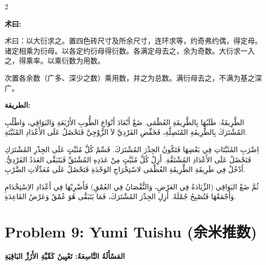 \documentclass[11pt,a4paper]{article}
\newcommand{\ar}[1]{\arabicfont\beginR #1\endR}
\newcommand{\zhtext}[1]{{\chinese #1}}
\newenvironment{bilingual}{%
  \begin{paracol}{2}
}{%
  \end{paracol}
}
\newcommand{\cnlabel}[1]{\textcolor{algocolor}{\textbf{#1}}}
\newcommand{\arlabel}[1]{\ar{\textcolor{algocolor}{\textbf{#1}}}}
\begin{document}
\begin{bilingual}

\begin{leftcolumn*}
\cnlabel{术曰:}

术曰：以大衍求之。置四色砖尺寸及所余尺寸，连环求等，约奇弗约偶，得定母。诸定相乘为衍母。以各定约衍母得衍数。各满定母去之，余为奇数。大衍求一入之，得乘率。以乘衍数为用数。

次置各余数（广多、深少之数）乘用数，并之为总数。满衍母去之，不满为基之深广。
\end{leftcolumn*}

\begin{rightcolumn*}
\arlabel{الطريقة:}

\ar{الطَّرِيقَةُ: طَلَبُهَا بِالطَّرِيقَةِ العُظْمَى. ضَعْ أَبْعَادَ أَنْوَاعِ الطُّوبِ الأَرْبَعَةِ وَالبَوَاقِي، وَاطْلُبِ المُشْتَرَكَ بِالطَّرِيقَةِ المُتَصِلَّةِ، فَخَفِّضِ الفَرْدِيَّ لاَ الزَّوْجِيَّ فَتَحْصُلُ عَلَى الأَعْدَادِ المُثَبَّتَةِ.}

\ar{اِضْرَبِ المُثَبَّتَاتِ فِي بَعْضِهَا فَتَكُونُ الجِذْرَ المُشْتَرَكَ. قَسِّمْ كُلَّ مُثَبَّتٍ عَلَى الجِذْرِ المُشْتَرَكِ فَتَحْصُلُ عَلَى الأَعْدَادِ المُشْتَقَّةِ. أَزِلْ كُلَّ مُثَبَّتٍ مِنْ عَدَدِهِ المُشْتَقِّ فَيَتَبَقَّى العَدَدُ الفَرْدِيُّ. اُدْخُلْ فِي طَرِيقَةِ الطَّرِيقَةِ العُظْمَى لاسْتِخْرَاجِ الوَحْدَةِ فَتَحْصُلُ عَلَى مُعَدِّلَاتِ الضَّرْبِ.}

\ar{ثُمَّ ضَعْ البَوَاقِي (الزِّيَادَةُ فِي العَرْضِ، وَالنُّقْصَانُ فِي العُمْقِ) فَأَضْرِبْهَا فِي أَعْدَادِ الاِسْتِخْدَامِ وَأَجْمَعْهَا فَتُصْبِحُ جُمْلَةً. أَزِلِ الجِذْرَ المُشْتَرَكَ، فَمَا يَتَبَقَّى هُوَ عُمْقُ وَعَرْضُ القَاعِدَةِ.}
\end{rightcolumn*}

\end{bilingual}

\newpage

\section{Problem 9: Yumi Tuishu (\zhtext{余米推数})}
\ar{\textbf{المَسْأَلَةُ التَّاسِعَةُ: تَعْيِينُ كَمِّيَّةِ الأَرُزِّ البَاقِيَةِ}}
\end{document}
